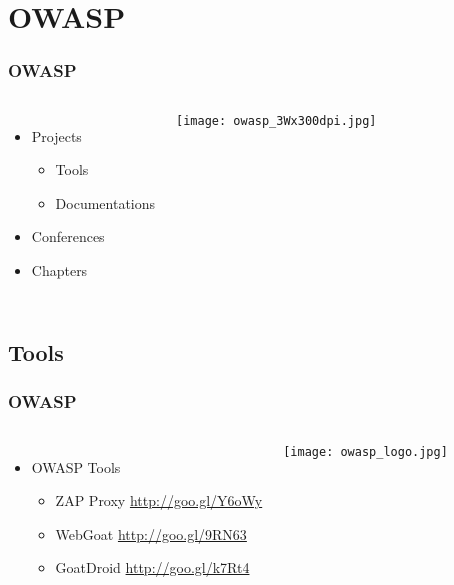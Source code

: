 \documentclass[xcolor=pdftex,table,handouts]{beamer}
\begin{document}
\section{OWASP}

\begin{frame}
	\frametitle{OWASP}
	\begin{columns}
			\begin{itemize}
				\item Projects
				\begin{itemize}
					\item Tools
					\item Documentations
				\end{itemize}
				\item Conferences
				\item Chapters
			\end{itemize}
	\begin{center}
\texttt{[image: owasp\_3Wx300dpi.jpg]}	
\end{center}	
	\end{columns}
\end{frame}

\subsection{Tools}
\begin{frame}
	\frametitle{OWASP}
	\begin{columns}
		\column{.6\textwidth}
			\begin{itemize}
				\item OWASP Tools
				\begin{itemize}
					\item ZAP Proxy {\url{http://goo.gl/Y6oWy}}
					\item WebGoat {\url{http://goo.gl/9RN63}}
					\item GoatDroid {\url{http://goo.gl/k7Rt4}}
				\end{itemize}
			\end{itemize}
		\column{.4\textwidth}
			\begin{center}
				\texttt{[image: owasp\_logo.jpg]}
			\end{center}
		\end{columns}
\end{frame}
\end{document}
